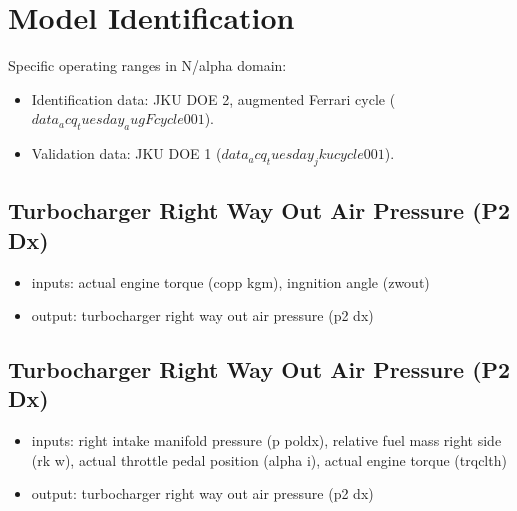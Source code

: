
\section{Model Identification}
\label{sec:modelidentification}

Specific operating ranges  in N/alpha domain:
\begin{itemize}
	\item{Identification data: JKU DOE 2, augmented Ferrari cycle ($data_acq_tuesday_augFcycle001$).}
	\item{Validation data: JKU DOE 1 ($data_acq_tuesday_jkucycle001$).}
\end{itemize}



\subsection{Turbocharger Right Way Out Air Pressure (P2 Dx)}
\begin{itemize}
	\item{inputs: actual engine torque (copp kgm), ingnition angle (zwout)}
	\item{output: turbocharger right way out air pressure (p2 dx)}
\end{itemize}	



%
%
%
%

\newpage

\subsection{Turbocharger Right Way Out Air Pressure (P2 Dx)}
\begin{itemize}
	\item{inputs: right intake manifold pressure (p poldx), relative fuel mass right side (rk w), actual throttle pedal position (alpha i), actual engine torque (trqclth)}
	\item{output: turbocharger right way out air pressure (p2 dx)}
\end{itemize}

